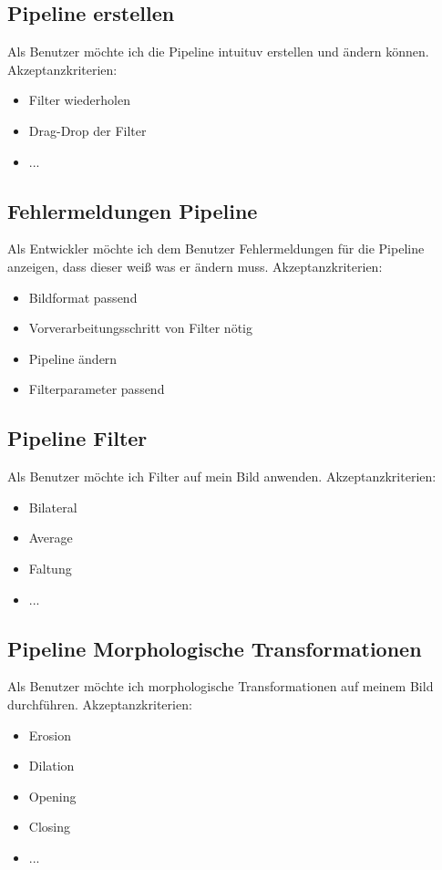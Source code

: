 \documentclass[conference]{IEEEtran}
\begin{document}
\subsection{Pipeline erstellen}
Als Benutzer möchte ich die Pipeline intuituv erstellen und ändern können.
Akzeptanzkriterien:
\begin{itemize}
	\item Filter wiederholen
	\item Drag-Drop der Filter
	\item ...
\end{itemize}

\subsection{Fehlermeldungen Pipeline}
Als Entwickler möchte ich dem Benutzer Fehlermeldungen für die Pipeline anzeigen, dass dieser weiß was er ändern muss. 
Akzeptanzkriterien: 
\begin{itemize}
	\item Bildformat passend
	\item Vorverarbeitungsschritt von Filter nötig
	\item Pipeline ändern
	\item Filterparameter passend
\end{itemize}

\subsection{Pipeline Filter}
Als Benutzer möchte ich Filter auf mein Bild anwenden.
Akzeptanzkriterien:
\begin{itemize}
	\item Bilateral
	\item Average
	\item Faltung
	\item ...
\end{itemize}

\subsection{Pipeline Morphologische Transformationen}
Als Benutzer möchte ich morphologische Transformationen auf meinem Bild durchführen.
Akzeptanzkriterien:
\begin{itemize}
	\item Erosion
	\item Dilation
	\item Opening
	\item Closing
	\item ...
\end{itemize}
\end{document}
